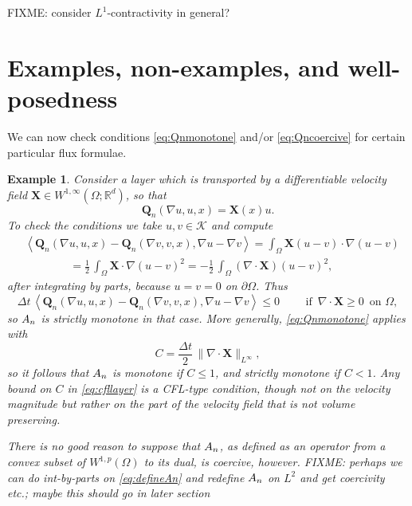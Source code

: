 \documentclass[final,leqno,onefignum,onetabnum]{siamltex1213bueler}
\newtheorem{example}{Example}
\newcommand\bQ{\mathbf{Q}}
\newcommand\bX{\mathbf{X}}
\newcommand{\Div}{\nabla\cdot}
\renewcommand{\grad}{\nabla}
\newcommand{\ip}[2]{\ensuremath{\left<#1,#2\right>}}
\newcommand\RR{\mathbb{R}}
\begin{document}
FIXME: consider $L^1$-contractivity in general?


\section{Examples, non-examples, and well-posedness} \label{sec:examples}

We can now check conditions \eqref{eq:Qnmonotone} and/or \eqref{eq:Qncoercive} for certain particular flux formulae.

\begin{example}  Consider a layer which is transported by a differentiable velocity field $\bX \in W^{1,\infty}(\Omega;\RR^d)$, so that
\begin{equation}
  \bQ_n(\grad u,u,x) = \bX(x) u.
\end{equation}
To check the conditions we take $u,v\in\mathcal{K}$ and compute
\begin{align*}
   &\ip{\bQ_n(\grad u,u,x) - \bQ_n(\grad v,v,x)}{\grad u - \grad v} = \int_\Omega \bX (u-v) \cdot \grad (u - v) \\
   &\qquad\qquad = \frac{1}{2}\,\int_\Omega \bX \cdot \grad (u - v)^2 = - \frac{1}{2}\,\int_\Omega \left(\Div\bX\right) (u - v)^2,
\end{align*}
after integrating by parts, because $u=v=0$ on $\partial \Omega$.  Thus
\begin{equation}
\Delta t\,\ip{\bQ_n(\grad u,u,x) - \bQ_n(\grad v,v,x)}{\grad u - \grad v} \le 0 \qquad \text{ if }\, \Div\bX\ge 0\, \text{ on } \Omega,
\end{equation}
so $A_{n}$ is strictly monotone in that case.  More generally, \eqref{eq:Qnmonotone} applies with 
\begin{equation}
C = \frac{\Delta t}{2}\,\|\Div\bX\|_{L^\infty}, \label{eq:cfllayer}
\end{equation}
so it follows that $A_{n}$ is monotone if $C\le 1$, and strictly monotone if $C<1$.  Any bound on $C$ in \eqref{eq:cfllayer} is a CFL-type condition, though not on the velocity magnitude but rather on the part of the velocity field that is not volume preserving.

There is no good reason to suppose that $A_{n}$, as defined as an operator from a convex subset of $W^{1,p}(\Omega)$ to its dual, is coercive, however.  FIXME: perhaps we can do int-by-parts on \eqref{eq:defineAn} and redefine $A_{n}$ on $L^2$ and get coercivity etc.; maybe this should go in later section
\end{example}
\end{document}
